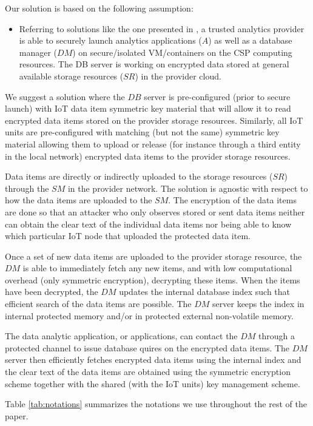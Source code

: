 {Our solution is based on the following assumption:
\begin{itemize}
\item Referring to solutions like the one presented in \cite{Schuster2015} \cite{Paladi2017}, a trusted analytics provider is able to securely launch analytics applications ($A$) as well as a database manager ($DM$) on secure/isolated VM/containers on the CSP computing resources. The DB server is working on encrypted data stored at general available storage resources ($SR$) in the provider cloud. 
\end {itemize}
We suggest a solution where the $DB$ server is pre-configured (prior to secure launch) with IoT data item symmetric key material that will allow it to read encrypted data items stored on the provider storage resources. Similarly, all IoT units are pre-configured with matching (but not the same) symmetric key material allowing them to upload or release (for instance through a third entity in the local network) encrypted data items to the provider storage resources.

Data items are directly or indirectly uploaded to the storage resources ($SR$) through the $SM$ in the provider network. The solution is agnostic with respect to how the data items are uploaded to the $SM$. The encryption of the data items are done so that an attacker who only observes stored or sent data items neither can obtain the clear text of the individual data items nor being able to know which particular IoT node that uploaded the protected data item. 
 
Once a set of new data items are uploaded to the provider storage resource, the $DM$ is able to immediately fetch any new items, and with low computational overhead (only symmetric encryption), decrypting these items. When the items have been decrypted, the $DM$ updates the internal database index such that efficient search of the data items are possible. The $DM$ server keeps the index in internal protected memory and/or in protected external non-volatile memory.

The data analytic application, or applications, can contact the $DM$ through a protected channel to issue database quires on the encrypted data items. The $DM$ server then efficiently fetches encrypted data items using the internal index and the clear text of the data items are obtained using the symmetric encryption scheme together with the shared (with the IoT units) key management scheme.

Table \ref{tab:notations} summarizes the notations we use throughout the rest of the paper.

}
